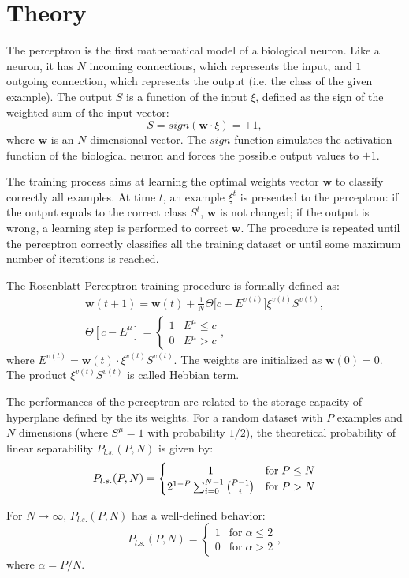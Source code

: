 \section{Theory}
\label{sec:fundamentals}

The perceptron is the first mathematical model of a biological neuron.
Like a neuron, it has $N$ incoming connections, which represents the input, and $1$ outgoing connection, which represents the output (i.e. the class of the given example).
The output $S$ is a function of the input $\xi$, defined as the sign of the weighted sum of the input vector:
\begin{equation}
    S = sign(\mathsf{\bm{w}} \cdotp \xi) = \pm 1,
    \label{eq:perceptron-activation}
\end{equation}
where $\mathsf{\bm{w}}$ is an $N$-dimensional vector.
The $sign$ function simulates the activation function of the biological neuron and forces the possible output values to $\pm 1$.

The training process aims at learning the optimal weights vector $\mathsf{\bm{w}}$ to classify correctly all examples.
At time $t$, an example $\xi^t$ is presented to the perceptron:
if the output equals to the correct class $S^t$, $\mathsf{\bm{w}}$ is not changed;
if the output is wrong, a learning step is performed to correct $\mathsf{\bm{w}}$.
The procedure is repeated until the perceptron correctly classifies all the training dataset or until some maximum number of iterations is reached.

The Rosenblatt Perceptron training procedure is formally defined as:
\begin{gather}
    \label{eq:perceptron-weight-update}
    \mathsf{\bm{w}}(t+1) = \mathsf{\bm{w}}(t) + \frac{1}{N} \Theta \big[c - E^{v(t)}\big] \xi^{v(t)} S^{v(t)}, \\
    \Theta[c - E^{\mu}] =  \begin{cases} \label{eq:heaviside-fun}
        1 & E^{\mu} \leq c \\
        0 & E^{\mu} > c
    \end{cases},
\end{gather}
where $E^{v(t)} = \mathsf{\bm{w}}(t) \cdot \xi^{v(t)} S^{v(t)}$.
The weights are initialized as $\mathsf{\bm{w}}(0) = 0$.
The product $\xi^{v(t)} S^{v(t)}$ is called Hebbian term.

The performances of the perceptron are related to the storage capacity of hyperplane defined by the its weights.
For a random dataset with $P$ examples and $N$ dimensions (where $S^\mu = 1$ with probability $1/2$), the theoretical probability of linear separability $P_{l.s.}(P,N)$ is given by:
\begin{equation}
    P_{l.s.}(P,N) =
    \begin{cases}
        \hfil 1 & \text{for} \; P \leq N \\
        2^{1-P} \sum^{N-1}_{i=0} \binom{P - 1}{i} & \text{for} \; P > N       
    \end{cases}
    \label{eq:prob-lin-sep}
\end{equation}

For $N \rightarrow \infty$, $P_{l.s.}(P,N)$ has a well-defined behavior:
\begin{equation} \label{eq:prob-lin-sep-alpha}
    P_{l.s.}(P,N) =
    \begin{cases}
        1 & \text{for} \; \alpha \leq 2 \\
        0 & \text{for} \; \alpha > 2
    \end{cases},
\end{equation}
where $\alpha = P / N$.
